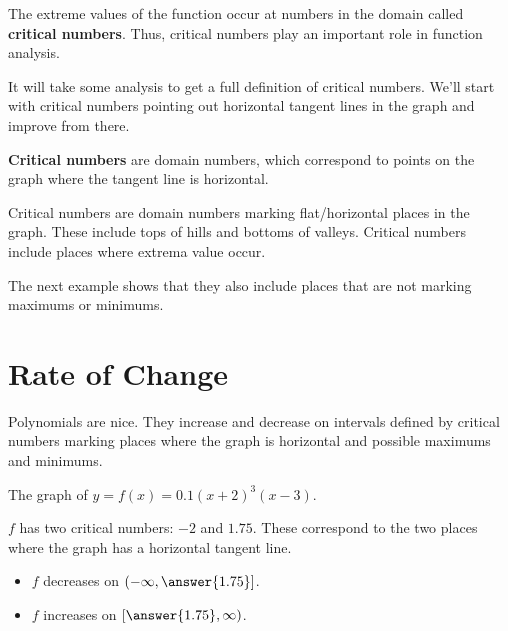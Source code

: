 \documentclass{ximera}
\begin{document}
The extreme values of the function occur at numbers in the domain called \textbf{critical numbers}.  Thus, critical numbers play an important role in function analysis.  


It will take some analysis to get a full definition of critical numbers. We'll start with critical numbers pointing out horizontal tangent lines in the graph and improve from there.









\begin{definition}

\textbf{Critical numbers} are domain numbers, which correspond to points on the graph where the tangent line is horizontal.

\end{definition}




Critical numbers are domain numbers marking flat/horizontal places in the graph.  These include tops of hills and bottoms of valleys. Critical numbers include places where extrema value occur.


The next example shows that they also include places that are not marking maximums or minimums.














\section{Rate of Change}



Polynomials are nice.  They increase and decrease on intervals defined by critical numbers marking places where the graph is horizontal and possible maximums and minimums.









\begin{example}

The graph of $y = f(x) = 0.1(x+2)^3(x-3)$.



\begin{center}
\end{center}



$f$ has two critical numbers: $-2$ and $1.75$. These correspond to the two places where the graph has a horizontal tangent line.

\begin{itemize}
\item $f$ decreases on $\left(-\infty, \answer{1.75}\right]$.
\item $f$ increases on $\left[\answer{1.75}, \infty\right)$.
\end{itemize}




\end{example}
\end{document}
